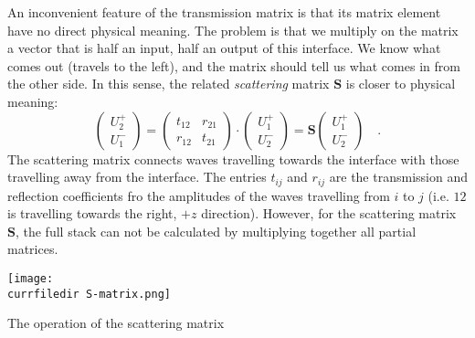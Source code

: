 An inconvenient feature of the transmission matrix is that its matrix element have no direct physical meaning. The problem is that we multiply on the matrix a vector that is half an input, half an output of this interface. We know what comes out (travels to the left), and the matrix should tell us what comes in from the other side. In this sense, the related \emph{scattering} matrix $\mathbf{S}$ is closer to physical meaning:
\begin{equation}
\begin{pmatrix}
U_2^+ \\ U_1^-
\end{pmatrix}
= 
\begin{pmatrix}
t_{12} & r_{21}  \\ r_{12} & t_{21}
\end{pmatrix}
\cdot
\begin{pmatrix}
U_1^+ \\ U_2^-
\end{pmatrix}
%
= \mathbf{S}
\begin{pmatrix}
U_1^+ \\ U_2^-
\end{pmatrix} \quad . 
\end{equation}
The scattering matrix connects waves travelling towards the interface with those travelling away from the interface. The entries $t_{ij}$ and $r_{ij}$ are the transmission and reflection coefficients fro the amplitudes of the waves travelling from $i$ to $j$ (i.e. $12$ is travelling towards the right, $+z$ direction). However, for the scattering matrix $\mathbf{S}$, the full stack can not be calculated by multiplying together all partial matrices.

\begin{marginfigure}
\texttt{[image: \\currfiledir S-matrix.png]}

\caption{The operation of the scattering matrix
\label{fig:surface_S_matrix}}
\end{marginfigure}


